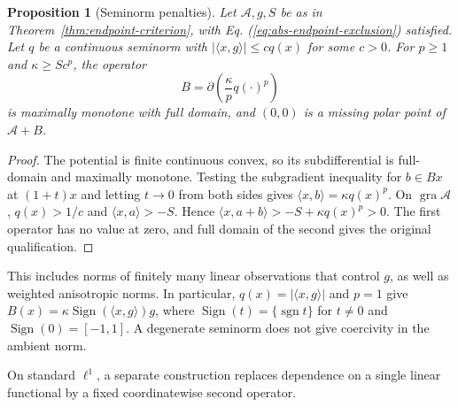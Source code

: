 \documentclass[11pt]{article}
\newcommand{\gra}{\operatorname{gra}}
\newcommand{\pair}[2]{\langle #1,#2\rangle}
\newtheorem{proposition}{Proposition}
\theoremstyle{definition}
\theoremstyle{remark}
\begin{document}
\begin{proposition}[Seminorm penalties]
\label{cor:seminorm-partners}
Let $\mathcal A,g,S$ be as in Theorem~\ref{thm:endpoint-criterion}, with Eq. (\ref{eq:abs-endpoint-exclusion}) satisfied. Let $q$ be a continuous seminorm with $|\pair{x}{g}|\le c q(x)$ for some $c>0$. For $p\ge1$ and $\kappa\ge Sc^p$, the operator
\[
B=\partial\left(\frac\kappa p q(\cdot)^p\right)
\]
is maximally monotone with full domain, and $(0,0)$ is a missing polar point of $\mathcal A+B$.
\end{proposition}
\begin{proof}
The potential is finite continuous convex, so its subdifferential is full-domain and maximally monotone. Testing the subgradient inequality for $b\in Bx$ at $(1+t)x$ and letting $t\to0$ from both sides gives $\pair{x}{b}=\kappa q(x)^p$. On $\gra\mathcal A$, $q(x)>1/c$ and $\pair{x}{a}>-S$. Hence $\pair{x}{a+b}>-S+\kappa q(x)^p>0$. The first operator has no value at zero, and full domain of the second gives the original qualification.
\end{proof}

This includes norms of finitely many linear observations that control $g$, as well as weighted anisotropic norms. In particular, $q(x)=|\pair{x}{g}|$ and $p=1$ give $B(x)=\kappa\operatorname{Sign}(\pair{x}{g})g$, where $\operatorname{Sign}(t)=\{\operatorname{sgn}t\}$ for $t\ne0$ and $\operatorname{Sign}(0)=[-1,1]$. A degenerate seminorm does not give coercivity in the ambient norm.

On standard $\ell^1$, a separate construction replaces dependence on a single linear functional by a fixed coordinatewise second operator.
\end{document}
